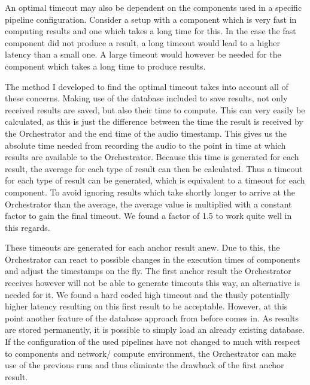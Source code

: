 An optimal timeout may also be dependent on the components used in a specific pipeline configuration.
Consider a setup with a component which is very fast in computing results and one which takes a long time for this.
In the case the fast component did not produce a result, a long timeout would lead to a higher latency than a small one.
A large timeout would however be needed for the component which takes a long time to produce results.

\label{main:orc:database}
The method I developed to find the optimal timeout takes into account all of these concerns.
Making use of the database included to save results, not only received results are saved, but also their time to compute.
This can very easily be calculated, as this is just the difference between the time the result is received by the Orchestrator and the end time of the audio timestamp.
This gives us the absolute time needed from recording the audio to the point in time at which results are available to the Orchestrator.
Because this time is generated for each result, the average for each type of result can then be calculated.
Thus a timeout for each type of result can be generated, which is equivalent to a timeout for each component.
To avoid ignoring results which take shortly longer to arrive at the Orchestrator than the average, the average value is multiplied with a constant factor to gain the final timeout.
We found a factor of 1.5 to work quite well in this regards.

These timeouts are generated for each anchor result anew.
Due to this, the Orchestrator can react to possible changes in the execution times of components and adjust the timestamps on the fly.
The first anchor result the Orchestrator receives however will not be able to generate timeouts this way, an alternative is needed for it.
We found a hard coded high timeout and the thusly potentially higher latency resulting on this first result to be acceptable.
However, at this point another feature of the database approach from before comes in.
As results are stored permanently, it is possible to simply load an already existing database.
If the configuration of the used pipelines have not changed to much with respect to components and network/ compute environment, the Orchestrator can make use of the previous runs and thus eliminate the drawback of the first anchor result.


